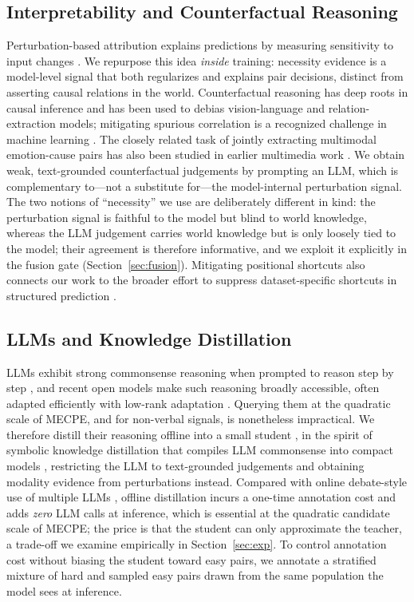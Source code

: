 \documentclass[journal]{IEEEtran}
\begin{document}
\subsection{Interpretability and Counterfactual Reasoning}
Perturbation-based attribution explains predictions by measuring sensitivity to input
changes \cite{ribeiro2016lime,lundberg2017shap}. We repurpose this idea \emph{inside}
training: necessity evidence is a model-level signal that both regularizes and explains
pair decisions, distinct from asserting causal relations in the world. Counterfactual
reasoning has deep roots in causal inference \cite{pearl2009causality} and has been used
to debias vision-language \cite{niu2021counterfactual} and relation-extraction
\cite{wang2022causal} models; mitigating spurious correlation is a recognized challenge
in machine learning \cite{geng2022spurious}. The closely related task of jointly
extracting multimodal emotion-cause pairs has also been studied in earlier multimedia
work \cite{chen2022mmecpe}.
We obtain weak, text-grounded counterfactual judgements by prompting an LLM, which is
complementary to---not a substitute for---the model-internal perturbation signal. The
two notions of ``necessity'' we use are deliberately different in kind: the
perturbation signal is faithful to the model but blind to world knowledge, whereas the
LLM judgement carries world knowledge but is only loosely tied to the model; their
agreement is therefore informative, and we exploit it explicitly in the fusion gate
(Section~\ref{sec:fusion}). Mitigating positional shortcuts also connects our work to
the broader effort to suppress dataset-specific shortcuts in structured prediction
\cite{geng2022spurious}.

\subsection{LLMs and Knowledge Distillation}
LLMs exhibit strong commonsense reasoning when prompted to reason step by step
\cite{wei2022cot}, and recent open models \cite{qwen2025,glm2024,llama32024} make such
reasoning broadly accessible, often adapted efficiently with low-rank adaptation
\cite{hu2021lora}. Querying them at the quadratic scale of MECPE, and for non-verbal
signals, is nonetheless impractical. We therefore distill their reasoning offline into a
small student \cite{hinton2015distilling}, in the spirit of symbolic knowledge
distillation that compiles LLM commonsense into compact models
\cite{west2022symbolic}, restricting the LLM to text-grounded judgements
and obtaining modality evidence from perturbations instead. Compared with online
debate-style use of multiple LLMs \cite{wu2025decdebate}, offline distillation incurs a
one-time annotation cost and adds \emph{zero} LLM calls at inference, which is essential
at the quadratic candidate scale of MECPE; the price is that the student can only
approximate the teacher, a trade-off we examine empirically in
Section~\ref{sec:exp}. To control annotation cost without biasing the student toward
easy pairs, we annotate a stratified mixture of hard and sampled easy pairs drawn from
the same population the model sees at inference.
\end{document}
